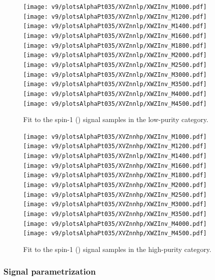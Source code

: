 \begin{figure}[!htb]
  \centering
    \texttt{[image: v9/plotsAlphaPt035/XVZnnlp/XWZInv\_M1000.pdf]}
    \texttt{[image: v9/plotsAlphaPt035/XVZnnlp/XWZInv\_M1200.pdf]}
    \texttt{[image: v9/plotsAlphaPt035/XVZnnlp/XWZInv\_M1400.pdf]}
     \\
    \texttt{[image: v9/plotsAlphaPt035/XVZnnlp/XWZInv\_M1600.pdf]}
    \texttt{[image: v9/plotsAlphaPt035/XVZnnlp/XWZInv\_M1800.pdf]}
    \texttt{[image: v9/plotsAlphaPt035/XVZnnlp/XWZInv\_M2000.pdf]}
     \\
    \texttt{[image: v9/plotsAlphaPt035/XVZnnlp/XWZInv\_M2500.pdf]}
    \texttt{[image: v9/plotsAlphaPt035/XVZnnlp/XWZInv\_M3000.pdf]}
    \texttt{[image: v9/plotsAlphaPt035/XVZnnlp/XWZInv\_M3500.pdf]}
     \\
    \texttt{[image: v9/plotsAlphaPt035/XVZnnlp/XWZInv\_M4000.pdf]}
    \texttt{[image: v9/plotsAlphaPt035/XVZnnlp/XWZInv\_M4500.pdf]}
  \caption{Fit to the spin-1 (\Wp) signal samples in the low-purity category.}
  \label{fig:XWZnnlp_Signal}
\end{figure}


\begin{figure}[!htb]
  \centering
    \texttt{[image: v9/plotsAlphaPt035/XVZnnhp/XWZInv\_M1000.pdf]}
    \texttt{[image: v9/plotsAlphaPt035/XVZnnhp/XWZInv\_M1200.pdf]}
    \texttt{[image: v9/plotsAlphaPt035/XVZnnlp/XWZInv\_M1400.pdf]}
     \\
    \texttt{[image: v9/plotsAlphaPt035/XVZnnhp/XWZInv\_M1600.pdf]}
    \texttt{[image: v9/plotsAlphaPt035/XVZnnhp/XWZInv\_M1800.pdf]}
    \texttt{[image: v9/plotsAlphaPt035/XVZnnhp/XWZInv\_M2000.pdf]}
     \\
    \texttt{[image: v9/plotsAlphaPt035/XVZnnhp/XWZInv\_M2500.pdf]}
    \texttt{[image: v9/plotsAlphaPt035/XVZnnhp/XWZInv\_M3000.pdf]}
    \texttt{[image: v9/plotsAlphaPt035/XVZnnhp/XWZInv\_M3500.pdf]}
     \\
    \texttt{[image: v9/plotsAlphaPt035/XVZnnhp/XWZInv\_M4000.pdf]}
    \texttt{[image: v9/plotsAlphaPt035/XVZnnhp/XWZInv\_M4500.pdf]}
  \caption{Fit to the spin-1 (\Wp) signal samples in the high-purity category.}
  \label{fig:XWZnnhp_Signal}
\end{figure}



\subsubsection{Signal parametrization}

